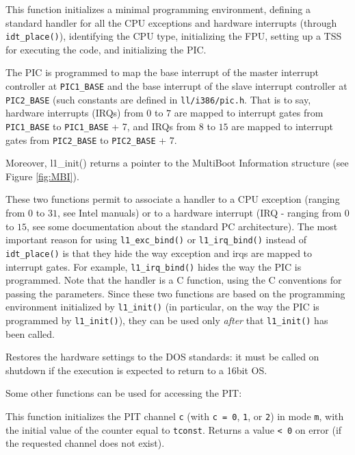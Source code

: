 \documentclass[a4paper]{report}
\begin{document}
This function initializes a minimal programming environment, defining a
standard handler for all the CPU exceptions and hardware interrupts (through
{\tt idt\_place()}), identifying the CPU type, initializing the FPU, setting
up a TSS for executing the code, and initializing the PIC.

The PIC is programmed to map the base interrupt of the master interrupt
controller at {\tt PIC1\_BASE} and the base interrupt of the slave
interrupt controller at {\tt PIC2\_BASE} (such constants are defined in
{\tt ll/i386/pic.h}. That is to say, hardware interrupts (IRQs) from $0$
to $7$ are mapped to interrupt gates from {\tt PIC1\_BASE} to
{\tt PIC1\_BASE} + 7, and IRQs from $8$ to $15$ are mapped to interrupt
gates from {\tt PIC2\_BASE} to {\tt PIC2\_BASE} + 7.

Moreover, {l1\_init()} returns a pointer to the MultiBoot Information
structure (see Figure \ref{fig:MBI}).


These two functions permit to associate a handler to a CPU exception
(ranging from $0$ to $31$, see Intel manuals) or to a hardware interrupt
(IRQ - ranging from $0$ to $15$, see some documentation about the standard
PC architecture). The most important reason for using {\tt l1\_exc\_bind()}
or {\tt l1\_irq\_bind()} instead of {\tt idt\_place()} is that they hide
the way exception and irqs are mapped to interrupt gates. For example,
{\tt l1\_irq\_bind()} hides the way the PIC is programmed.
Note that the handler is a C function, using the C conventions for passing
the parameters. Since these two functions are based on the programming
environment initialized by {\tt l1\_init()} (in particular, on the way
the PIC is programmed by {\tt l1\_init()}), they can be used only
{\em after} that {\tt l1\_init()} has been called.

Restores the hardware settings to the DOS standards: it must be called on
shutdown if the execution is expected to return to a 16bit OS.

Some other functions can be used for accessing the PIT:


This function initializes the PIT channel {\tt c} (with {\tt c = 0},
{\tt 1}, or {\tt 2}) in mode {\tt m}, with the initial value of the
counter equal to {\tt tconst}. Returns a value {\tt < 0} on error (if
the requested channel does not exist).
\end{document}
